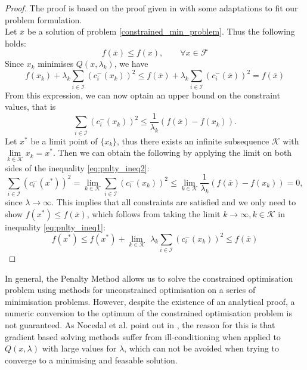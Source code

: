 \begin{proof}
	The proof is based on the proof given in \cite{NoceWrig06} with some adaptations to fit our problem formulation.\\
	Let $\overline{x}$ be a solution of problem \eqref{constrained_min_problem}. Thus the following holds: \[ f(\overline{x}) \leq f(x), \qquad \forall x \in \mathcal{F}\]
	Since $x_k$ minimises $Q(x, \lambda_k)$, we have 
	\begin{equation}
	\label{eq:pnlty_ineq1}
	f(x_k) + \lambda_k \sum_{i \in \mathcal{I}} (c_i^{-}(x_k))^2 \leq 
	f(\overline{x}) + \lambda_k \sum_{i \in \mathcal{I}} (c_i^{-}(\overline{x}))^2 =
	f(\overline{x})
	\end{equation}
	From this expression, we can now optain an upper bound on the constraint values, that is
	\begin{equation}
	\label{eq:pnlty_ineq2}
	\sum_{i \in \mathcal{I}} (c_i^{-}(x_k))^2 \leq \frac{1}{\lambda_k} (f(\overline{x}) - f(x_k)).
	\end{equation}
	Let $x^*$ be a limit point of $\{x_k\}$, thus there exists an infinite subsequence $\mathcal{K}$ with $\underset{k \in \mathcal{K}}{\lim} x_k = x^*$. Then we can obtain the following by applying the limit on both sides of the inequality \eqref{eq:pnlty_ineq2}:
	\[ 
	\sum_{i \in \mathcal{I}} (c_i^{-}(x^*))^2 = 
	\underset{k \in \mathcal{K}}{\lim} \sum_{i \in \mathcal{I}} (c_i^{-}(x_k))^2 \leq
	\underset{k \in \mathcal{K}}{\lim} \frac{1}{\lambda_k} (f(\overline{x}) - f(x_k)) = 0,
	 \]
	 since $\lambda \to \infty$. This implies that all constraints are satisfied and we only need to show $f(x^*) \leq f(\overline{x})$, which follows from taking the limit $k \to \infty, k \in \mathcal{K}$ in inequality \eqref{eq:pnlty_ineq1}:
	 \[ f(x^*) \leq f(x^*) +  \underset{k \in \mathcal{K}}{\lim} \,\,\lambda_k \sum_{i \in \mathcal{I}} (c_i^{-}(x_k))^2 \leq f(\overline{x})\]
\end{proof}

In general, the Penalty Method allows us to solve the constrained optimisation problem using methods for unconstrained optimisation on a series of minimisation problems. However, despite the existence of an analytical proof, a numeric conversion to the optimum of the constrained optimisation problem is not guaranteed. As Nocedal et al. point out in \cite{NoceWrig06}, the reason for this is that gradient based solving methods suffer from ill-conditioning when applied to $Q(x, \lambda)$ with large values for $\lambda$, which can not be avoided when trying to converge to a minimising and feasable solution.

